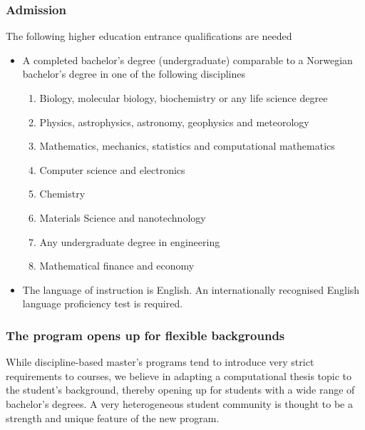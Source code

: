 \documentclass{beamer}
\begin{document}
\begin{frame}
\frametitle{Admission}

\begin{block}{}
The following higher education entrance qualifications are needed

\begin{itemize}
\item A completed bachelor's degree (undergraduate) comparable to a Norwegian bachelor's degree in one of the following disciplines
\begin{enumerate}

 \item Biology, molecular biology, biochemistry  or any life science degree

 \item Physics, astrophysics, astronomy, geophysics and meteorology

 \item Mathematics, mechanics, statistics and computational mathematics

 \item Computer science and electronics

 \item Chemistry

 \item Materials Science and nanotechnology

 \item Any undergraduate degree in engineering

 \item Mathematical finance and economy

\end{enumerate}

\noindent
\item The language of instruction is English. An internationally recognised English language proficiency test is required.
\end{itemize}

\noindent
\end{block}
\end{frame}

\begin{frame}
\frametitle{The program opens up for flexible backgrounds}

\begin{block}{}
While discipline-based master's programs tend to introduce very strict
requirements to courses, we believe in adapting a computational thesis
topic to the student's background, thereby opening up for
students with a wide range of bachelor's degrees.
A very heterogeneous student community is thought to be a strength and
unique feature of the new program.
\end{block}
\end{frame}
\end{document}

